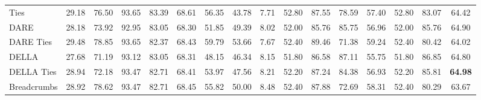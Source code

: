 \begin{table*}
{\begin{tabular}{lcccccccc|c|cc|cccc}
            Ties                              & 29.18                                     & 76.50            & 93.65                                      & 83.39                                  & 68.61                                 & 56.35                                   & 43.78                         & 7.71     & 52.80           & 87.55           & 78.59       & 57.40 & 52.80 & 83.07 & 64.42             \\
            DARE                              & 28.18                                     & 73.92            & 92.95                                      & 83.05                                  & 68.30                                 & 51.85                                   & 49.39                         & 8.02     & 52.00           & 85.76           & 85.75       & 56.96 & 52.00 & 85.76 & 64.90             \\
            DARE Ties                         & 29.48                                     & 78.85            & 93.65                                      & 82.37                                  & 68.43                                 & 59.79                                   & 53.66                         & 7.67     & 52.40           & 89.46           & 71.38       & 59.24 & 52.40 & 80.42 & 64.02             \\
            DELLA                             & 27.68                                     & 71.19            & 93.12                                      & 83.05                                  & 68.31                                 & 48.15                                   & 46.34                         & 8.15     & 51.80           & 86.58           & 87.11       & 55.75 & 51.80 & 86.85 & 64.80             \\
            DELLA  Ties                       & 28.94                                     & 72.18            & 93.47                                      & 82.71                                  & 68.41                                 & 53.97                                   & 47.56                         & 8.21     & 52.20           & 87.24           & 84.38       & 56.93 & 52.20 & 85.81 & \textbf{64.98}    \\
            Breadcrumbs                       & 28.92                                     & 78.62            & 93.47                                      & 82.71                                  & 68.45                                 & 55.82                                   & 50.00                         & 8.48     & 52.40           & 87.88           & 72.69       & 58.31 & 52.40 & 80.29 & 63.67             \\

\end{tabular}}
\end{table*}
